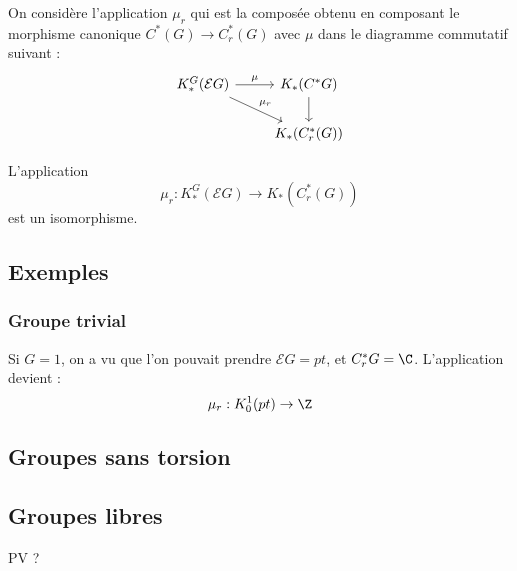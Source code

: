 On considère l'application $\mu_r$ qui est la composée obtenu en composant le morphisme canonique $C^*(G)\rightarrow C^*_r(G)$ avec $\mu$ dans le diagramme commutatif suivant :\\ 
\[
\begin{tikzcd}
K_*^G(\mathcal E G)\arrow{dr}{\mu_r}\arrow{r}{\mu}     &  K_*(C^* G)\arrow{d}  \\
									& K_*(C^*_r(G))
\end{tikzcd}
\]
\begin{conj}
L'application 
\[\mu_r : K_*^G(\mathcal E G)\rightarrow K_*(C^*_r(G))\]
est un isomorphisme.
\end{conj}

\subsection{Exemples}
\subsubsection{Groupe trivial}
Si $G=1$, on a vu que l'on pouvait prendre $\mathcal E G=pt$, et $C^*_r G=\C$. L'application devient :
\[\mu_r : K_0^1(pt)\rightarrow \Z\] 

\subsection{Groupes sans torsion}

\subsection{Groupes libres}
PV ?
